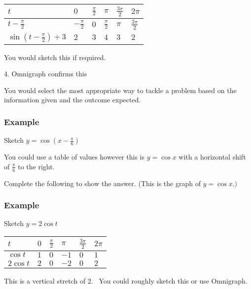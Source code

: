 \begin{tabular}[c]{|l|l|l|l|l|l|}\hline
$t$  & $0$  & $\frac{\pi }{2}$  & $\pi $  & $\frac{3 \pi }{2}$  & $2 \pi $  \\
\hline
$t -\frac{\pi }{2}$  & $ -\frac{\pi }{2}$  & $0$  & $\frac{\pi }{2}$  & $\pi $  & $\frac{3 \pi }{2}$  \\
\hline
$\sin  \left (t -\frac{\pi }{2}\right ) +3$  & $2$  & $3$  & $4$  & $3$  & $2$  \\
\hline
\end{tabular}

You would sketch this if required. 

4. Omnigraph confirms this 

   
\setlength\fboxrule{0.01in}\setlength\fboxsep{0.2in}


You would select the most appropriate way to tackle a problem based on the information given and the outcome expected. 

\subsubsection{Example}
Sketch $y =\cos  (x -\frac{\pi }{6})$ 

You could use a table of values however this is $y =\cos  x$ with a horizontal shift of $\frac{\pi }{6}$ to the right. 

Complete the following to show the answer. (This is the graph of $y =\cos  x .)$ 

   
\setlength\fboxrule{0.01in}\setlength\fboxsep{0.2in}


\subsubsection{Example}
Sketch $y =2 \cos  t$ 


\begin{tabular}[c]{|l|l|l|l|l|l|}\hline
$t$  & $0$  & $\frac{\pi }{2}$  & $\pi $  & $\frac{3 \pi }{2}$  & $2 \pi $  \\
\hline
$\cos  t$  & $1$  & $0$  & $ -1$  & $0$  & $1$  \\
\hline
$2 \cos  t$  & $2$  & $0$  & $ -2$  & $0$  & $2$  \\
\hline
\end{tabular}

This is a vertical stretch of 2. \ You could roughly sketch this or use Omnigraph. 


